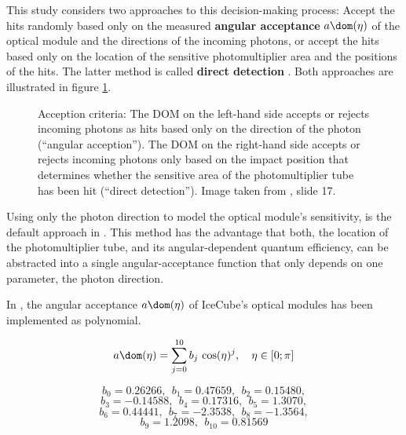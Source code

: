 This study considers two approaches to this decision-making process: Accept the hits randomly based only on the measured \textbf{angular acceptance} $a\dom(\eta)$ of the optical module and the directions of the incoming photons, or accept the hits based only on the location of the sensitive photomultiplier area and the positions of the hits. The latter method is called \textbf{direct detection} \cite{martinspicehddard}. Both approaches are illustrated in figure \ref{fig:kieQuoh1}.

\begin{figure}[htbp]
  \centering
  \caption{Acception criteria: The DOM on the left-hand side accepts or rejects incoming photons as hits based only on the direction of the photon (``angular acception''). The DOM on the right-hand side accepts or rejects incoming photons only based on the impact position that determines whether the sensitive area of the photomultiplier tube has been hit (``direct detection''). Image taken from \cite{martinspicehddard}, slide 17.}
  \label{fig:kieQuoh1}
\end{figure}

Using only the photon direction to model the optical module's sensitivity, is the default approach in . This method has the advantage that both, the location of the photomultiplier tube, and its angular-dependent quantum efficiency, can be abstracted into a single angular-acceptance function that only depends on one parameter, the photon direction.

In , the angular acceptance $a\dom(\eta)$ of IceCube's optical modules has been implemented as polynomial.

\begin{equation}
  a\dom(\eta) = \sum_{j = 0}^{10} b_j\,\cos(\eta)^j, \ \ \ \eta \in [0; \pi]
  \label{eq:anominal}
\end{equation}

$$ b_0 = 0.26266, \ \ b_1 = 0.47659, \ \ b_2 = 0.15480, $$
$$ b_3 = -0.14588, \ \ b_4 = 0.17316, \ \ b_5 = 1.3070, $$
$$ b_6 = 0.44441, \ \ b_7 = -2.3538, \ \ b_8 = -1.3564, $$
$$ b_9 = 1.2098, \ \ b_{10} = 0.81569 $$


